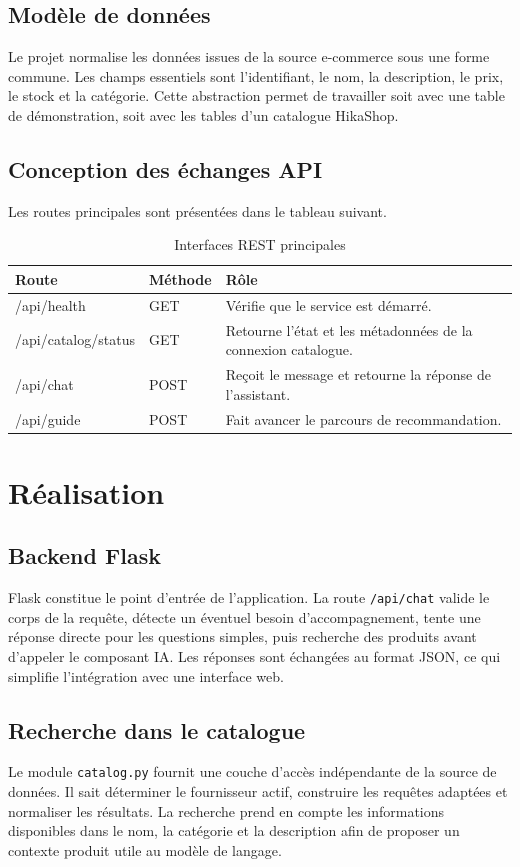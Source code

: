 \documentclass[12pt,a4paper,oneside]{report}
\begin{document}
\section{Modèle de données}
Le projet normalise les données issues de la source e-commerce sous une forme commune. Les champs essentiels sont l'identifiant, le nom, la description, le prix, le stock et la catégorie. Cette abstraction permet de travailler soit avec une table de démonstration, soit avec les tables d'un catalogue HikaShop.

\section{Conception des échanges API}
Les routes principales sont présentées dans le tableau suivant.
\begin{table}[H]
\centering
\caption{Interfaces REST principales}
\begin{tabularx}{\textwidth}{>{\ttfamily}l l X}
\toprule
Route & Méthode & Rôle \\
\midrule
/api/health & GET & Vérifie que le service est démarré. \\
/api/catalog/status & GET & Retourne l'état et les métadonnées de la connexion catalogue. \\
/api/chat & POST & Reçoit le message et retourne la réponse de l'assistant. \\
/api/guide & POST & Fait avancer le parcours de recommandation. \\
\bottomrule
\end{tabularx}
\end{table}

\chapter{Réalisation}
\section{Backend Flask}
Flask constitue le point d'entrée de l'application. La route \texttt{/api/chat} valide le corps de la requête, détecte un éventuel besoin d'accompagnement, tente une réponse directe pour les questions simples, puis recherche des produits avant d'appeler le composant IA. Les réponses sont échangées au format JSON, ce qui simplifie l'intégration avec une interface web.

\section{Recherche dans le catalogue}
Le module \texttt{catalog.py} fournit une couche d'accès indépendante de la source de données. Il sait déterminer le fournisseur actif, construire les requêtes adaptées et normaliser les résultats. La recherche prend en compte les informations disponibles dans le nom, la catégorie et la description afin de proposer un contexte produit utile au modèle de langage.
\end{document}
